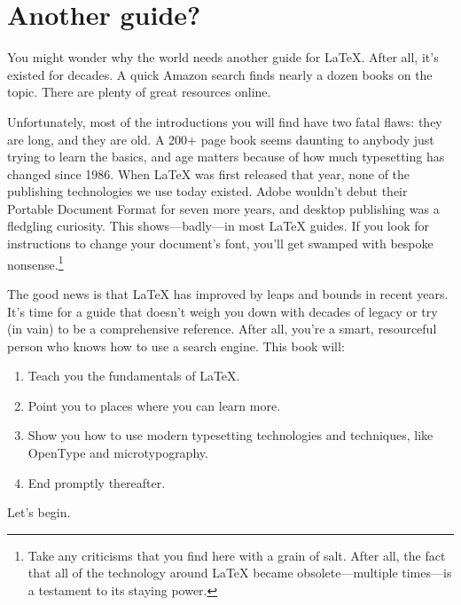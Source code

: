 \section{Another guide?}

You might wonder why the world needs another guide for \LaTeX{}.
After all, it's existed for decades.
A quick Amazon search finds nearly a dozen books on the topic.
There are plenty of great resources online.

Unfortunately, most of the introductions you will find have two fatal flaws:
they are long, and they are old.
A 200+ page book seems daunting to anybody just trying to learn the basics,
and age matters because of how much typesetting has changed since 1986.
When \LaTeX{} was first released that year, none of the publishing technologies
we use today existed.
Adobe wouldn't debut their Portable Document Format for seven more years,
and desktop publishing was a fledgling curiosity.
This shows---badly---in most \LaTeX{} guides.
If you look for instructions to change your document's font,
you'll get swamped with bespoke nonsense.\punckern\footnote{%
Take any criticisms that you find here with a grain of
salt. After all, the fact that all of the technology around \LaTeX{} became
obsolete---multiple times---is a testament to its staying power.}

The good news is that  \LaTeX{} has improved by leaps and bounds in recent years.
It's time for a guide that doesn't weigh you down with decades of legacy
or try (in vain) to be a comprehensive reference.
After all, you're a smart, resourceful person who knows how to use a
search engine.
This book will:

\begin{enumerate}
\item Teach you the fundamentals of \LaTeX.
\item Point you to places where you can learn more.
\item Show you how to use modern typesetting technologies and techniques,
    like OpenType and microtypography.
\item End promptly thereafter.
\end{enumerate}
\vspace{\baselineskip}

\noindent Let's begin.

